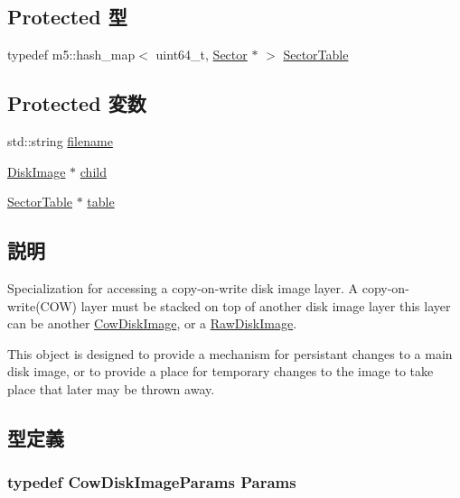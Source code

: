 \subsection*{Protected 型}
\begin{DoxyCompactItemize}
\item 
typedef m5::hash\_\-map$<$ uint64\_\-t, \hyperlink{structCowDiskImage_1_1Sector}{Sector} $\ast$ $>$ \hyperlink{classCowDiskImage_a22b16d3053a4078053e44e56fe64875d}{SectorTable}
\end{DoxyCompactItemize}
\subsection*{Protected 変数}
\begin{DoxyCompactItemize}
\item 
std::string \hyperlink{classCowDiskImage_ae80f820219e45772366a2a68de6a54c4}{filename}
\item 
\hyperlink{classDiskImage_1_1DiskImage}{DiskImage} $\ast$ \hyperlink{classCowDiskImage_a3053e924a69d07b168217ad41e6b877b}{child}
\item 
\hyperlink{classCowDiskImage_a22b16d3053a4078053e44e56fe64875d}{SectorTable} $\ast$ \hyperlink{classCowDiskImage_a98c079cb623ba6bc8bf495e981e80c43}{table}
\end{DoxyCompactItemize}


\subsection{説明}
Specialization for accessing a copy-\/on-\/write disk image layer. A copy-\/on-\/write(COW) layer must be stacked on top of another disk image layer this layer can be another \hyperlink{classCowDiskImage}{CowDiskImage}, or a \hyperlink{classRawDiskImage}{RawDiskImage}.

This object is designed to provide a mechanism for persistant changes to a main disk image, or to provide a place for temporary changes to the image to take place that later may be thrown away. 

\subsection{型定義}
\hypertarget{classCowDiskImage_a564df726143da4914743e9d8c1a17c6c}{
\subsubsection[{Params}]{\setlength{\rightskip}{0pt plus 5cm}typedef CowDiskImageParams {\bf Params}}}
\label{classCowDiskImage_a564df726143da4914743e9d8c1a17c6c}


